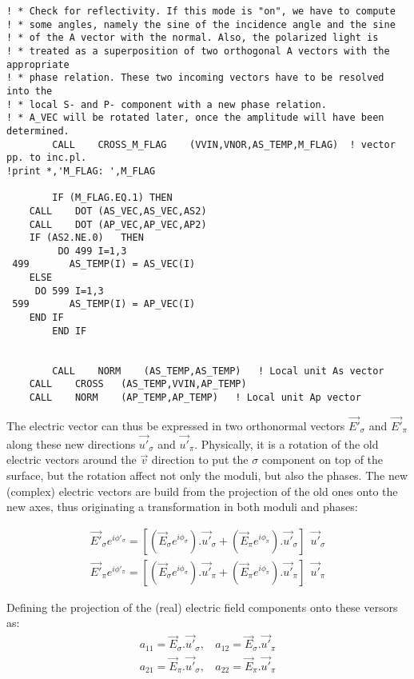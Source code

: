 \documentclass[a4paper,10pt]{article}
\begin{document}
\begin{lstlisting}
! * Check for reflectivity. If this mode is "on", we have to compute
! * some angles, namely the sine of the incidence angle and the sine
! * of the A vector with the normal. Also, the polarized light is 
! * treated as a superposition of two orthogonal A vectors with the appropriate
! * phase relation. These two incoming vectors have to be resolved into the
! * local S- and P- component with a new phase relation.
! * A_VEC will be rotated later, once the amplitude will have been determined.
     	CALL	CROSS_M_FLAG 	(VVIN,VNOR,AS_TEMP,M_FLAG)	! vector pp. to inc.pl.
!print *,'M_FLAG: ',M_FLAG

     	IF (M_FLAG.EQ.1) THEN
	CALL	DOT	(AS_VEC,AS_VEC,AS2)
	CALL	DOT	(AP_VEC,AP_VEC,AP2)
	IF (AS2.NE.0)	THEN
     	 DO 499 I=1,3
 499   	   AS_TEMP(I) = AS_VEC(I)
	ELSE
	 DO 599 I=1,3
 599	   AS_TEMP(I) = AP_VEC(I)
	END IF
     	END IF


     	CALL	NORM  	(AS_TEMP,AS_TEMP)	! Local unit As vector
	CALL	CROSS	(AS_TEMP,VVIN,AP_TEMP)
	CALL	NORM	(AP_TEMP,AP_TEMP)	! Local unit Ap vector
\end{lstlisting}

The electric vector can thus be expressed in two orthonormal vectors $\vec{E'}_\sigma$ and $\vec{E'}_\pi$ along these 
new directions $\vec{u'}_\sigma$ and $\vec{u'}_\pi$. Physically, it is a rotation of the old electric vectors around
the $\vec{v}$ direction to put the $\sigma$ component on top of the surface, but the rotation affect not only the 
moduli, but also the phases. The new (complex) electric vectors are build from the projection of the old ones onto the
new axes, thus originating a transformation in both moduli and phases:

\begin{eqnarray}
\vec{E'}_\sigma e^{i \phi'_\sigma} = [(\vec{E}_\sigma e^{i \phi_\sigma}).\vec{u'}_\sigma + (\vec{E}_\pi e^{i \phi_\pi}).\vec{u'}_\sigma ] 
  ~~\vec{u'}_\sigma  \\ 
\vec{E'}_\pi e^{i \phi'_\pi} = [(\vec{E}_\sigma e^{i \phi_\sigma}).\vec{u'}_\pi + (\vec{E}_\pi e^{i \phi_\pi}).\vec{u'}_\pi ] 
  ~~\vec{u'}_\pi 
\end{eqnarray}


Defining the projection of the (real) electric field components onto these versors as: 
\begin{eqnarray}
a_{11} = \vec{E}_\sigma . \vec{u'}_\sigma, ~~~~ 
a_{12} = \vec{E}_\sigma . \vec{u'}_\pi \nonumber \\
a_{21} = \vec{E}_\pi . \vec{u'}_\sigma, ~~~~
a_{22} = \vec{E}_\pi . \vec{u'}_\pi 
\end{eqnarray}
\end{document}
